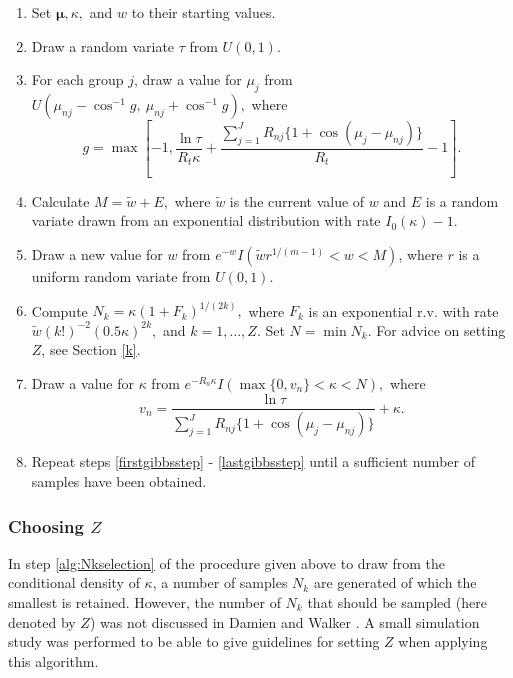 \documentclass[]{gSCS2e}
\theoremstyle{plain}
\theoremstyle{definition}
\theoremstyle{remark}
\begin{document}
\begin{enumerate}



\item Set $\boldsymbol\mu, \kappa,$ and $w$ to their starting values.  

\item  Draw a random variate $\tau$ from $U(0, 1)$. \label{firstgibbsstep}

\item  For each group $j$, draw a value for $\mu_j$ from $U(\mu_{nj} - \cos^{-1}g,~ \mu_{nj} + \cos^{-1}g),$ where $$ g=\max\left[-1, \frac{\ln \tau}{R_t \kappa} + \frac{\sum_{j=1}^{J} R_{nj} \{ 1 + \cos (\mu_j - \mu_{nj} ) \} } {R_t} - 1 \right]. $$

\item Calculate $ M = \tilde{w} + E,$ where $\tilde{w}$ is the current value of $w$ and $E$ is a random variate drawn from an exponential distribution with rate $I_0(\kappa) - 1$.

\item  Draw a new value for $w$ from $e^{-w} I(\tilde{w}r^{1/(m-1)} < w < M)$, where $r$ is a uniform random variate from $U(0,1)$. 

\item Compute $ N_k = \kappa (1 + F_k)^{1/(2k)},$ where $F_k$ is an exponential r.v. with rate $\tilde{w}(k!)^{-2} (0.5\kappa )^{2k},$ and $k = 1, \dots, Z$. Set $N = \min N_k$. For advice on setting $Z$, see Section \ref{k}. \label{alg:Nkselection} 

\item  Draw a value for $\kappa$ from $e^{-R_n\kappa} I( \max\{0, v_n\} < \kappa < N),$ where $$ v_n = \frac{\ln \tau}{\sum_{j=1}^{J} R_{nj} \{1+\cos(\mu_j - \mu_{nj}) \} } + \kappa.$$ \label{lastgibbsstep}

\item Repeat steps \ref{firstgibbsstep} - \ref{lastgibbsstep} until a sufficient number of samples have been obtained.

\end{enumerate}  


\subsubsection{Choosing $Z$ \label{k}}

In step \ref{alg:Nkselection} of the procedure given above to draw from the conditional density of $\kappa$, a number of samples $N_k$ are generated of which the smallest is retained. However, the number of $N_k$  that should be sampled (here denoted by $Z$) was not discussed in Damien and Walker \cite{damien1999fullbayes}. A small simulation study was performed to be able to give guidelines for setting $Z$ when applying this algorithm. 
\end{document}
